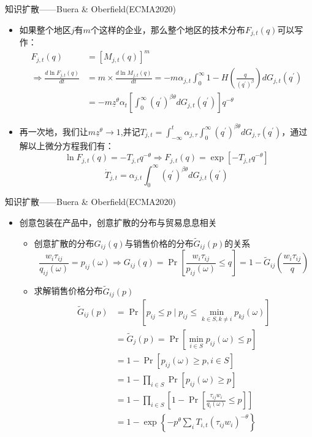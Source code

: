 \documentclass{beamer}
\begin{document}
\begin{frame}{知识扩散——Buera \& Oberfield(ECMA2020)}
\begin{itemize}
    \item 如果整个地区\(j\)有\(m\)个这样的企业，那么整个地区的技术分布\(F_{j,t}\left(q\right)\)可以写作：
\small
\begin{align*}
    F_{j,t}(q)&=\left[M_{j,t}(q)\right]^{m}\\\Longrightarrow\frac{d\ln F_{j,t}(q)}{dt}&=m\times\frac{d\ln M_{j,t}(q)}{dt}=-m\alpha_{j,t}\int_{0}^{\infty}1-H(\frac{q}{\left(q^{\prime}\right)^{\beta}})dG_{j,t}(q^{\prime})\\&=-m\underline{z}^{\theta}\alpha_{t}\left[\int_{0}^{\infty}\left(q^{\prime}\right)^{\beta\theta}dG_{j,t}(q^{\prime})\right]q^{-\theta}
\end{align*}
    \item 再一次地，我们让\(m\underline{z}^{\theta}\rightarrow1\),并记\(T_{j,t}=\int_{-\infty}^{t}\alpha_{j,\tau}\int_{0}^{\infty}\left(q^{\prime}\right)^{\beta\theta}d{G}_{j,\tau}(q^{\prime})\)，通过解以上微分方程我们有：
\[\ln F_{j,t}(q)=-T_{j,t}q^{-\theta}\Longrightarrow F_{j,t}(q)=\exp\left[-T_{j,t}q^{-\theta}\right]\]
\[\dot{T}_{j,t}=\alpha_{j,t}\int_{0}^{\infty}\left(q^{\prime}\right)^{\beta\theta}d{G}_{j,t}(q^{\prime})\]
\end{itemize}
\end{frame}

\begin{frame}{知识扩散——Buera \& Oberfield(ECMA2020)}
    \begin{itemize}
        \item 创意包装在产品中，创意扩散的分布与贸易息息相关
        \begin{itemize}
            \item 创意扩散的分布\(G_{ij}(q)\)与销售价格的分布\(\tilde{G}_{ij}(p)\)的关系
\[\frac{w_{i}\tau_{ij}}{q_{ij}(\omega)}=p_{ij}(\omega)\Longrightarrow G_{ij}(q)=\Pr\left[\frac{w_{i}\tau_{ij}}{p_{ij}(\omega)}\leq q\right]=1-\tilde{G}_{ij}(\frac{w_{i}\tau_{ij}}{q})\]
            \item 求解销售价格分布\(\tilde{G}_{ij}(p)\)
\footnotesize
\begin{align*}
    \tilde{G}_{ij}(p)&=\Pr\left[p_{ij}\leq p\mid p_{ij}\leq\min_{k\in S,k\neq i}p_{kj}(\omega)\right]\\&=\tilde{G}_{j}(p)=\Pr\left[\min_{i\in S}p_{ij}(\omega)\leq p\right]\\&=1-\Pr\left[p_{ij}(\omega)\geq p,i\in S\right]\\&=1-\prod_{i\in S}\Pr\left[p_{ij}(\omega)\geq p\right]\\&=1-\prod_{i\in S}\left[1-\Pr\left[\frac{\tau_{ij}w_{i}}{q_{i}(\omega)}\leq p\right]\right]\\&=1-\exp\left\{ -p^{\theta}\sum_{i}T_{i,t}\left(\tau_{ij}w_{i}\right)^{-\theta}\right\} 
\end{align*}
        \end{itemize}
    \end{itemize}
\end{frame}
\end{document}
